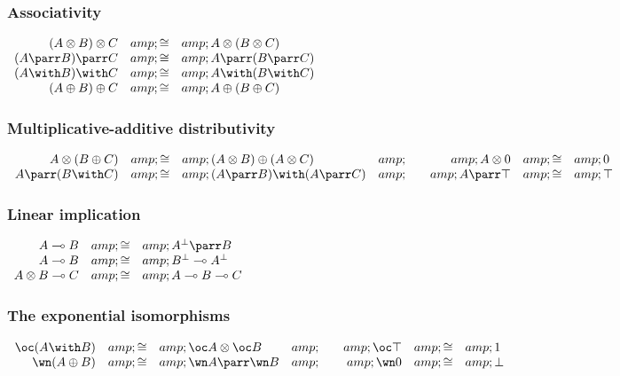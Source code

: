 \subsubsection{Associativity}\label{associativity}

\(\begin{array}{rcl}
  (A\tens B)\tens C &amp;\cong&amp; A\tens(B\tens C)\\
  (A\parr B)\parr C &amp;\cong&amp; A\parr(B\parr C)\\
  (A\with B)\with C &amp;\cong&amp; A\with(B\with C)\\
  (A\plus B)\plus C &amp;\cong&amp; A\plus(B\plus C)\\
\end{array}\)

\subsubsection{Multiplicative-additive distributivity}\label{multiplicative-additive-distributivity}

\(\begin{array}{rclcrcl}
  A\tens(B\plus C) &amp;\cong&amp; (A\tens B)\plus(A\tens C) &amp;\quad&amp;
  A\tens\zero &amp;\cong&amp; \zero\\
  A\parr(B\with C) &amp;\cong&amp; (A\parr B)\with(A\parr C) &amp;\quad&amp;
  A\parr\top &amp;\cong&amp; \top\\
\end{array}\)

\subsubsection{Linear implication}\label{linear-implication}

\(\begin{array}{rclcrcl}
  A\limp B &amp;\cong&amp; A\orth\parr B\\
  A\limp B &amp;\cong&amp; B\orth\limp A\orth\\
  A\tens B \limp C &amp;\cong&amp; A\limp B \limp C\\
\end{array}\)

\subsubsection{The exponential isomorphisms}\label{the-exponential-isomorphisms}

\(\begin{array}{rclcrcl}
  \oc(A\with B) &amp;\cong&amp; \oc A\tens\oc B &amp;\quad&amp; \oc\top &amp;\cong&amp; \one\\
  \wn(A\plus B) &amp;\cong&amp; \wn A\parr\wn B &amp;\quad&amp; \wn\zero &amp;\cong&amp; \bot\\
\end{array}\)

